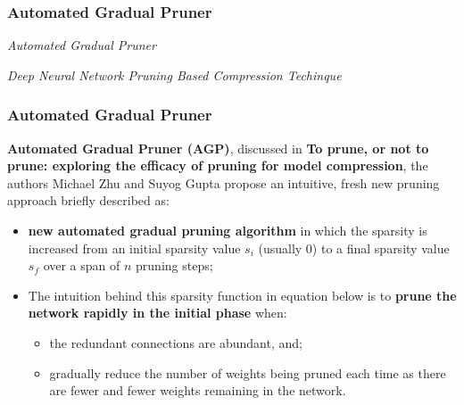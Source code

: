 
\begin{frame}
    \frametitle{Automated Gradual Pruner}
        \begin{center}
            {\fontsize{40}{50}\selectfont \emph{Automated Gradual Pruner}}
        \end{center}
        \begin{center}
            \emph{Deep Neural Network Pruning Based Compression Techinque}
        \end{center}
\end{frame}

\begin{frame}
    \frametitle{Automated Gradual Pruner}
        \textbf{Automated Gradual Pruner (AGP)}, discussed in \textbf{To prune, or not to prune: exploring the efficacy of pruning for model compression},
            the authors Michael Zhu and Suyog Gupta propose an intuitive, fresh new pruning approach briefly described as:

        \begin{itemize}
        \item \textbf{new automated gradual pruning algorithm} in which the sparsity is increased from an initial sparsity value $s_{i}$ (usually 0)
            to a ﬁnal sparsity value $s_{f}$ over a span of $n$ pruning steps;
        \item The intuition behind this sparsity function in equation below is to \textbf{prune the network rapidly in the initial phase} when:
            \begin{itemize}
                \item the redundant connections are abundant, and;
                \item gradually reduce the number of weights being pruned each time as there are fewer and fewer weights remaining in the network.
            \end{itemize}
        \end{itemize}

\end{frame}


